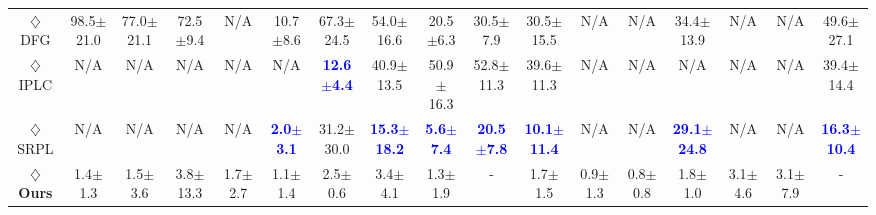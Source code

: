 \begin{table}[ht]
{\begin{tabular}{@{}ccccccccccccccccc@{}}
{ $\diamondsuit$ DFG} & {98.5$\pm$21.0} & {77.0$\pm$21.1} & {72.5$\pm$9.4} & {N/A} & {10.7$\pm$8.6} & {67.3$\pm$24.5} & {54.0$\pm$16.6} & {20.5$\pm$6.3} & {30.5$\pm$7.9} & {30.5$\pm$15.5}   & {N/A} & {N/A}& {34.4$\pm$13.9} & {N/A} & {N/A} & {49.6$\pm$27.1} \\

{ $\diamondsuit$ IPLC} & {N/A} & {N/A} & {N/A} & {N/A} & {N/A} & \textcolor{blue}{\textbf{12.6$\pm$4.4}} & {40.9$\pm$13.5} & {50.9$\pm$16.3} & {52.8$\pm$11.3} & {39.6$\pm$11.3}  & {N/A} & {N/A} & {N/A}  & {N/A} & {N/A} & {39.4$\pm$14.4} \\ 

{ $\diamondsuit$ SRPL} & {N/A} & {N/A} & {N/A} & {N/A} & \textcolor{blue}{\textbf{2.0$\pm$3.1}} & {31.2$\pm$30.0} & \textcolor{blue}{\textbf{15.3$\pm$18.2}} & \textcolor{blue}{\textbf{5.6$\pm$7.4}} & \textcolor{blue}{\textbf{20.5$\pm$7.8}} & \textcolor{blue}{\textbf{10.1$\pm$11.4}} & {N/A} & {N/A} & \textcolor{blue}{\textbf{29.1$\pm$24.8}}  & {N/A} & {N/A} & \textcolor{blue}{\textbf{16.3$\pm$10.4}} \\ \midrule

\textbf{$\diamondsuit$ Ours}  & {1.4$\pm$1.3} & {1.5$\pm$3.6}& {3.8$\pm$13.3}& {1.7$\pm$2.7}& {1.1$\pm$1.4} & {2.5$\pm$0.6}& {3.4$\pm$4.1}& {1.3$\pm$1.9}& {-}& {1.7$\pm$1.5}& {0.9$\pm$1.3}& {0.8$\pm$0.8}& {1.8$\pm$1.0}& {3.1$\pm$4.6}& {3.1$\pm$7.9}& {-} \\

\bottomrule
\end{tabular}%
}

\end{table}
